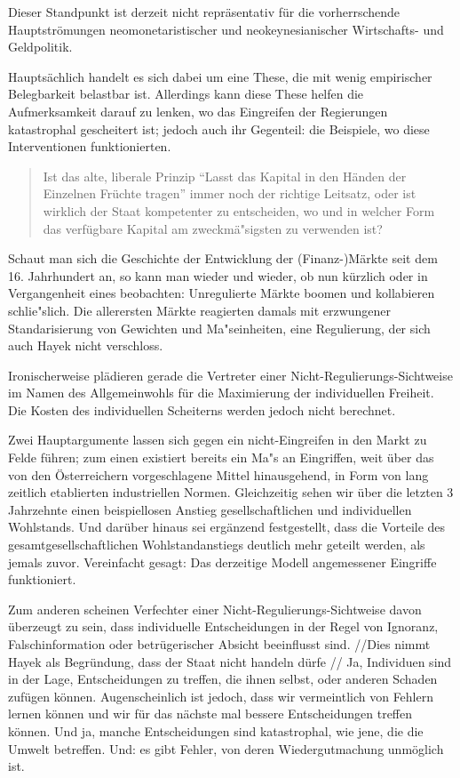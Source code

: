\documentclass[
        onecolumn,
        a4paper,
        abstracton,
        parskip=half
        ,final
        ]{scrartcl}
\begin{document}
Dieser Standpunkt ist derzeit nicht repr{\"a}sentativ f{\"u}r die vorherrschende Hauptstr{\"o}mungen neomonetaristischer und neokeynesianischer Wirtschafts- und Geldpolitik.

Haupts{\"a}chlich handelt es sich dabei um eine These, die mit wenig empirischer Belegbarkeit belastbar ist. Allerdings kann diese These helfen die Aufmerksamkeit darauf zu lenken, wo das Eingreifen der Regierungen katastrophal gescheitert ist; jedoch auch ihr Gegenteil: die Beispiele, wo diese Interventionen funktionierten.

\begin{quote}
Ist das alte, liberale Prinzip "`Lasst das Kapital in den H{\"a}nden der Einzelnen Fr{\"u}chte tragen"' immer noch der richtige Leitsatz,
oder ist wirklich der Staat kompetenter zu entscheiden, wo und in welcher Form das verf{\"u}gbare Kapital am zweckm{\"a}{"s}igsten zu verwenden ist? \citep*[S.23f]{Hayek1969}
\end{quote}

Schaut man sich die Geschichte der Entwicklung der (Finanz-)M{\"a}rkte seit dem 16. Jahrhundert an, so kann man wieder und wieder, ob nun k{\"u}rzlich oder in Vergangenheit eines beobachten: Unregulierte M{\"a}rkte boomen und kollabieren schlie{"s}lich. Die allerersten M{\"a}rkte reagierten damals mit erzwungener Standarisierung von Gewichten und Ma{"s}einheiten, eine Regulierung, der sich auch Hayek nicht verschloss.

Ironischerweise pl{\"a}dieren gerade die Vertreter einer Nicht-Regulierungs-Sichtweise im Namen des Allgemeinwohls f{\"u}r die Maximierung der individuellen Freiheit. Die Kosten des individuellen Scheiterns werden jedoch nicht berechnet.

Zwei Hauptargumente lassen sich gegen ein nicht-Eingreifen in den Markt zu Felde f{\"u}hren; zum einen existiert bereits ein Ma{"s} an Eingriffen, weit {\"u}ber das von den {\"O}sterreichern vorgeschlagene Mittel hinausgehend, in Form von lang zeitlich etablierten industriellen Normen. Gleichzeitig sehen wir {\"u}ber die letzten 3 Jahrzehnte einen beispiellosen Anstieg gesellschaftlichen und individuellen Wohlstands. Und dar{\"u}ber hinaus sei erg{\"a}nzend festgestellt, dass die Vorteile des gesamtgesellschaftlichen Wohlstandanstiegs deutlich mehr geteilt werden, als jemals zuvor. Vereinfacht gesagt: Das derzeitige Modell angemessener Eingriffe funktioniert.

Zum anderen scheinen Verfechter einer Nicht-Regulierungs-Sichtweise davon {\"u}berzeugt zu sein, dass individuelle Entscheidungen in der Regel von Ignoranz, Falschinformation oder betr{\"u}gerischer Absicht beeinflusst sind. //Dies nimmt Hayek als Begr{\"u}ndung, dass der Staat nicht handeln d{\"u}rfe //
Ja, Individuen sind in der Lage, Entscheidungen zu treffen, die ihnen selbst, oder anderen Schaden zuf{\"u}gen k{\"o}nnen. Augenscheinlich ist jedoch, dass wir vermeintlich von Fehlern lernen k{\"o}nnen und wir f{\"u}r das n{\"a}chste mal bessere Entscheidungen treffen k{\"o}nnen. Und ja, manche Entscheidungen sind katastrophal, wie jene, die die Umwelt betreffen. Und: es gibt Fehler, von deren Wiedergutmachung unm{\"o}glich ist.
\end{document}
